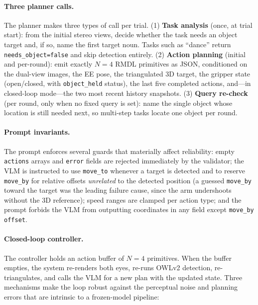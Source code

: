 \documentclass[conference]{IEEEtran}
\begin{document}
\paragraph{Three planner calls.}
The planner makes three types of call per trial. (1) \textbf{Task analysis} (once, at trial start): from the initial stereo views, decide whether the task needs an object target and, if so, name the first target noun. Tasks such as ``dance'' return \texttt{needs\_object=false} and skip detection entirely. (2) \textbf{Action planning} (initial and per-round): emit exactly $N=4$ RMDL primitives as JSON, conditioned on the dual-view images, the EE pose, the triangulated 3D target, the gripper state (open/closed, with \texttt{object\_held} status), the last five completed actions, and---in closed-loop mode---the two most recent history snapshots. (3) \textbf{Query re-check} (per round, only when no fixed query is set): name the single object whose location is still needed next, so multi-step tasks locate one object per round.

\paragraph{Prompt invariants.}
The prompt enforces several guards that materially affect reliability: empty \texttt{actions} arrays and \texttt{error} fields are rejected immediately by the validator; the VLM is instructed to use \texttt{move\_to} whenever a target is detected and to reserve \texttt{move\_by} for relative offsets \emph{unrelated} to the detected position (a guessed \texttt{move\_by} toward the target was the leading failure cause, since the arm undershoots without the 3D reference); speed ranges are clamped per action type; and the prompt forbids the VLM from outputting coordinates in any field except \texttt{move\_by offset}.

\paragraph{Closed-loop controller.}
The controller holds an action buffer of $N=4$ primitives. When the buffer empties, the system re-renders both eyes, re-runs OWLv2 detection, re-triangulates, and calls the VLM for a new plan with the updated state. Three mechanisms make the loop robust against the perceptual noise and planning errors that are intrinsic to a frozen-model pipeline:
\end{document}
